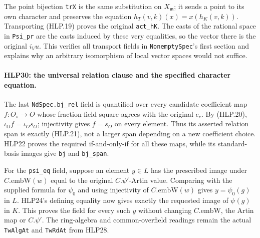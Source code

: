 The point bijection \texttt{tr\allowbreak X} is the same substitution on
\(X_{\mathfrak m}\); it sends a point to its own character and
preserves the equation
\(h_T(v,k)(x)=x(h_K(v,k))\). Transporting (HLP.19) proves the
original \texttt{act\_\allowbreak h\allowbreak K}. The casts of the rational space in
\texttt{Psi\_\allowbreak pr} are the casts induced by these very equalities,
so the vector there is the original \(i_Vu\). This verifies all
transport fields in \texttt{Nonempty\allowbreak Spec}'s first section and
explains why an arbitrary isomorphism of local vector spaces
would not suffice.

\paragraph{HLP30: the universal relation clause and the specified character equation.}
\label{claim:HLP30}
The last \texttt{Nd\allowbreak Spec.bj\_\allowbreak rel} field is quantified over every
candidate coefficient map \(f:O_s\to O\) whose fraction-field
square agrees with the original \(e_c\). By (HLP.20),
\(\iota_Of=\iota_Os_O\); injectivity gives \(f=s_O\) on every
element. Thus its asserted relation span is exactly (HLP.21),
not a larger span depending on a new coefficient choice. HLP22
proves the required if-and-only-if for all these maps, while its
standard-basis images give \texttt{bj} and \texttt{bj\_\allowbreak span}.

For the \texttt{psi\_\allowbreak eq} field, suppose an element \(y\in L\)
has the prescribed image under \(C.\mathrm{embW}(w)\) equal to
the original \(C.\psi'\)-Artin value. Comparing with the supplied
formula for \(\psi_0\) and using injectivity of
\(C.\mathrm{embW}(w)\) gives \(y=\psi_0(g)\) in \(L\).
HLP24's defining equality now gives exactly the requested image
of \(\psi(g)\) in \(K\). This proves the field for every such
\(y\) without changing \(C.\mathrm{embW}\), the Artin map or
\(C.\psi'\). The ring-algebra and common-overfield readings remain
the actual \texttt{Tw\allowbreak Alg\allowbreak At} and \texttt{Tw\allowbreak Rd\allowbreak At} from HLP28.

